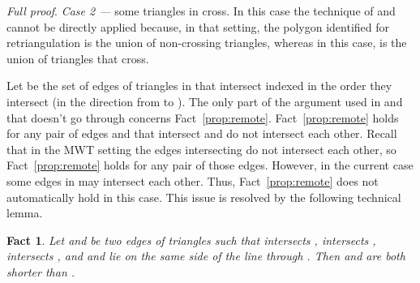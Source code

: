 \documentclass[final]{siamltex}
\newtheorem{fact}{Fact}[theorem]
\newenvironment{fullproof}{\par{\it Full proof}. \ignorespaces}{\endproof}
\begin{document}
\begin{fullproof}
\noindent
{\em Case 2 ---} some triangles in  cross.  In this case the technique of \cite{keil1994computing} and 
\cite{cheng1996approaching} cannot be directly applied because,
in that setting, the polygon  identified for retriangulation 
is the union of non-crossing triangles,
whereas in this case,  is the union of triangles that cross.

Let  be the set of edges of triangles in  that intersect  
indexed in the order they intersect  (in the direction from  to ).
The only part of the argument used in \cite{keil1994computing} and 
\cite{cheng1996approaching} that doesn't go through concerns Fact~\ref{prop:remote}. 
Fact~\ref{prop:remote} holds for any pair of edges  and  that 
intersect  and do not intersect each other. Recall that in the MWT setting the edges intersecting  
do not intersect each other, so Fact~\ref{prop:remote} holds for any pair 
of those edges. However, in the current case some edges in  may intersect each other. 
Thus, Fact~\ref{prop:remote} does not automatically hold in this case.  
This issue is resolved by the following technical lemma.
\begin{fact}\label{obs:point}
Let  and  be two edges of triangles  such that 
 intersects ,  intersects ,  
intersects , and  and  lie on the same side of the line through .
Then  and  are both shorter than .  
\end{fact}




\end{fullproof}
\end{document}
